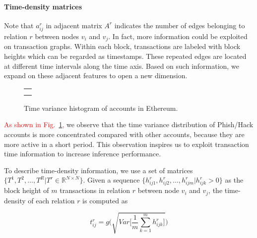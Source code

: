 \paragraph{Time-density matrices}
Note that $a^r_{ij}$ in adjacent matrix $A^r$ indicates the number of edges belonging to relation $r$ between nodes $v_i$ and $v_j$.
In fact, more information could be exploited on transaction graphs. Within each block, transactions are labeled with block heights which can be regarded as timestamps. These repeated edges are located at different time intervals along the time axis. Based on such information, we expand on these adjacent features to open a new dimension.


\begin{figure}[htbp]
\centering
\begin{tabular}{c}
	\subfigure[Time variance histogram of all nodes.]{
		\label{fig:high_order}
    
	}\\
	\subfigure[Time variance histogram of Phish/Hack nodes.]{
		\label{fig:asymmetric}
    
	}
\end{tabular}
\caption{Time variance histogram of accounts in Ethereum.}
\label{fig:time_std}
\end{figure}

\textcolor{red}{As shown in Fig.~\ref{fig:time_std},} we observe that the time variance distribution of Phish/Hack accounts is more concentrated compared with other accounts, because they are more active in a short period. This observation inspires us to exploit transaction time information to increase inference performance.

To describe time-density information, we use a set of matrices $\{T^1,T^2,\dots,T^R|T^r\in \mathbb{R}^{N \times N}\}$. Given a sequence $\{h_{ij1}^r,h_{ij2}^r,\dots,h_{ijm}^r | h_{ijk}^r>0\}$ as the block height of $m$ transactions in relation $r$ between node $v_i$ and $v_j$, the time-density of each relation $r$ is computed as%

\begin{equation}
t_{ij}^r=g\Bigg(\sqrt{Var\Big[\frac{1}{m}\sum_{k=1}^m h_{ijk}^r\Big]}\Bigg)
\label{eq:time}
\end{equation}

